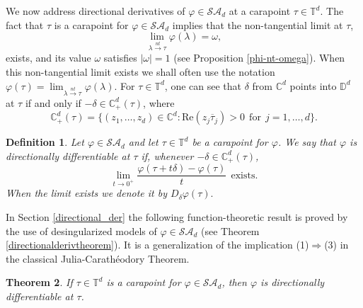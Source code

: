 \documentclass[11pt, reqno]{amsart}
\newtheorem{theorem}{Theorem}[section]
\newtheorem{definition}[theorem]{Definition}
\newcommand\1{\boldsymbol {1}}
\newcommand{\ph}{\varphi}
\numberwithin{equation}{section}
\begin{document}
We now address directional derivatives of $\varphi \in\mathcal{SA}_{d}$ at a carapoint $\tau \in\mathbb{T}^{d}$. The fact that $\tau$ is a carapoint for $\varphi \in\mathcal{SA}_{d}$ implies that the non-tangential limit at $\tau$,
$$\lim_{\lambda{\overset{nt}\rightarrow}\tau}\varphi(\lambda)=\omega,$$
exists, and its value $\omega$ satisfies $|\omega|=1$  (see Proposition \ref{phi-nt-omega}). 
When this non-tangential limit exists
we shall often use the notation $\varphi(\tau) = \lim_{\lambda{\overset{nt}\rightarrow}\tau}\varphi(\lambda)$.
For $\tau\in\mathbb{T}^{d}$, one can see that $\delta$ from $\mathbb{C}^{d}$ points into $\mathbb{D}^{d}$ at $\tau$ if and only if $-\delta \in\mathbb{C}^{d}_{+}(\tau)$, where
$$\mathbb{C}_{+}^{d}(\tau) = \big\{( z_{1},\hdots, z_{d})\in\mathbb{C}^{d} : \mathrm{Re}( z_{j}\overline{\tau}_{j})>0~~\text{for}~~j=1,\hdots,d\big\}.$$
\begin{definition}
Let $\varphi\in\mathcal{SA}_{d}$ and let $\tau\in\mathbb{T}^{d}$ be a carapoint for $\varphi$. We say that
$\varphi$ is {\em directionally differentiable} at $\tau$ if, whenever $-\delta \in\mathbb{C}^{d}_{+}(\tau)$,
$$\lim_{t\rightarrow 0^{+}} \dfrac{\varphi(\tau+t\delta)-\ph(\tau)}{t}~~{\text{exists}}.$$
When the limit exists we denote it by 
$D_{\delta}\varphi(\tau).$
\end{definition}
In Section \ref{directional_der} the following function-theoretic result is proved by the use of  desingularized models of $\varphi\in\mathcal{SA}_{d}$ (see Theorem \ref{directionalderivtheorem}). It is a generalization of the implication (1)$\Rightarrow$(3) in the classical Julia-Carath\'eodory Theorem. 
\begin{theorem}
If $\tau\in\mathbb{T}^{d}$ is a carapoint for $\varphi\in\mathcal{SA}_{d}$, then $\varphi$ is directionally differentiable at $\tau$.
\end{theorem}
\end{document}
